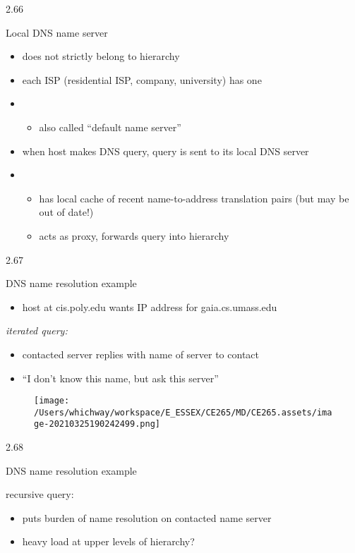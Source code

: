 \documentclass[
]{article}
\begin{document}
2.66

Local DNS name server

\begin{itemize}
\item
  does not strictly belong to hierarchy
\item
  each ISP (residential ISP, company, university) has one
\item
  \begin{itemize}
  \item
    also called ``default name server''
  \end{itemize}
\item
  when host makes DNS query, query is sent to its local DNS server
\item
  \begin{itemize}
  \item
    has local cache of recent name-to-address translation pairs (but may
    be out of date!)
  \item
    acts as proxy, forwards query into hierarchy
  \end{itemize}
\end{itemize}

2.67

DNS name resolution example

\begin{itemize}
\item
  host at cis.poly.edu wants IP address for gaia.cs.umass.edu
\end{itemize}

\emph{iterated query:}

\begin{itemize}
\item
  contacted server replies with name of server to contact
\item
  ``I don't know this name, but ask this server''
\end{itemize}

\begin{figure}
\centering
\texttt{[image: /Users/whichway/workspace/E\_ESSEX/CE265/MD/CE265.assets/image-20210325190242499.png]}
\caption{}
\end{figure}

2.68

DNS name resolution example

recursive query:

\begin{itemize}
\item
  puts burden of name resolution on contacted name server
\item
  heavy load at upper levels of hierarchy?
\end{itemize}
\end{document}
